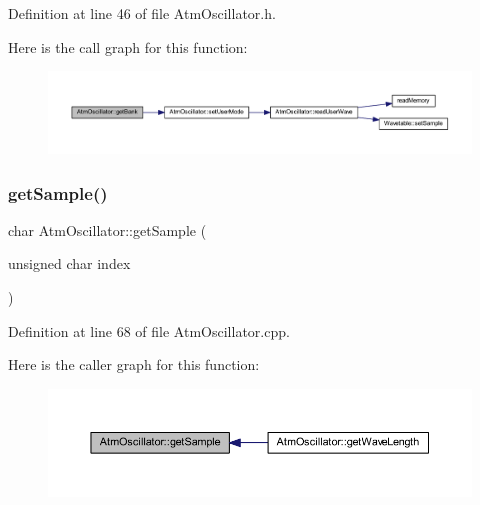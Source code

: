 Definition at line 46 of file Atm\+Oscillator.\+h.

Here is the call graph for this function\+:
\nopagebreak
\begin{figure}[H]
\begin{center}
\leavevmode
\includegraphics[width=350pt]{d8/d5f/class_atm_oscillator_a56b407e4175f4625e2e0d7a6f87c2225_cgraph}
\end{center}
\end{figure}
\mbox{\label{class_atm_oscillator_aa6fe7de8b2d573159271a47f5c8686e1}} 
\subsubsection{\texorpdfstring{get\+Sample()}{getSample()}}
{\footnotesize\ttfamily char Atm\+Oscillator\+::get\+Sample (\begin{DoxyParamCaption}\item[{unsigned char}]{index }\end{DoxyParamCaption})}



Definition at line 68 of file Atm\+Oscillator.\+cpp.

Here is the caller graph for this function\+:
\nopagebreak
\begin{figure}[H]
\begin{center}
\leavevmode
\includegraphics[width=350pt]{d8/d5f/class_atm_oscillator_aa6fe7de8b2d573159271a47f5c8686e1_icgraph}
\end{center}
\end{figure}
\mbox{\label{class_atm_oscillator_a01e9856e38a1e83b5d83fd503d5ad80e}} 
